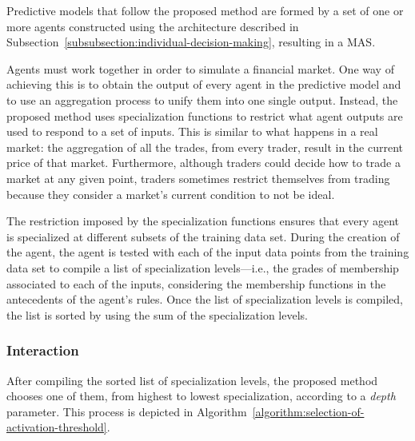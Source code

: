 \documentclass{ieeeaccess}
\begin{document}
Predictive models that follow the proposed method are formed by a set of one or more agents constructed using the architecture described in Subsection~\ref{subsubsection:individual-decision-making}, resulting in a MAS.

Agents must work together in order to simulate a financial market. One way of achieving this is to obtain the output of every agent in the predictive model and to use an aggregation process to unify them into one single output. Instead, the proposed method uses specialization functions to restrict what agent outputs are used to respond to a set of inputs. This is similar to what happens in a real market: the aggregation of all the trades, from every trader, result in the current price of that market. Furthermore, although traders could decide how to trade a
market at any given point, traders sometimes restrict themselves from trading because they consider a market's current condition to not be ideal.

The restriction imposed by the specialization functions ensures that every agent is specialized at different subsets of the training data set. During the creation of the agent, the agent is tested with each of the input data points from the training data set to compile a list of specialization levels---i.e., the grades of membership associated to each of the inputs, considering the membership functions in the antecedents of the agent's rules. Once the list of specialization levels is compiled, the list is sorted by using the sum of the specialization
levels. 


\subsubsection{Interaction}
\label{subsubsection:interaction}

After compiling the sorted list of specialization levels, the proposed method chooses one of them, from highest to lowest specialization, according to a \textit{depth} parameter. This process is depicted in Algorithm~\ref{algorithm:selection-of-activation-threshold}.
\end{document}
